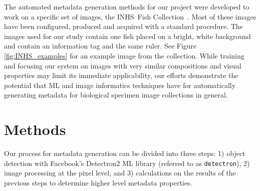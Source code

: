\documentclass[conference]{IEEEtran}
\begin{document}


The automated metadata generation methods for our project were developed to work on a specific set of images, the INHS\ Fish Collection~\cite{INHS}.  Most of these images have been configured, produced and acquired with a standard procedure.  The images used for our study contain one fish placed on a bright, white background and contain an information tag and the same ruler.  See Figure \ref{fig:INHS_examples} for an example image from the collection. While training and focusing our system on images with very similar compositions and visual properties may limit its immediate applicability, our efforts demonstrate the potential that ML and image informatics techniques have for automatically generating metadata for biological specimen image collections in general.

\section{Methods}
Our process for metadata generation can be divided into three steps: 1) object detection with Facebook's Detectron2 ML library (referred to as \verb|detectron|), 2) image processing at the pixel level, and 3) calculations on the results of the previous steps to determine higher level metadata properties.
\end{document}
